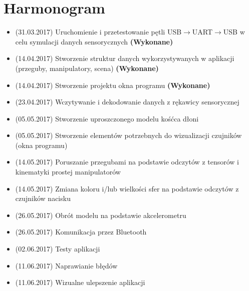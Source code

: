 \documentclass[12pt,a4paper]{article}
\begin{document}
\newpage
\section{Harmonogram}
\begin{itemize}
\item (31.03.2017) Uruchomienie i przetestowanie pętli USB$\rightarrow $UART$\rightarrow $USB w celu symulacji danych sensorycznych \textbf{(Wykonane)}
\item (14.04.2017) Stworzenie struktur danych wykorzystywanych w aplikacji (przeguby, manipulatory, scena) \textbf{(Wykonane)}
\item (14.04.2017) Stworzenie projektu okna programu \textbf{(Wykonane)}
\item (23.04.2017) Wczytywanie i dekodowanie danych z rękawicy sensorycznej
\item (05.05.2017) Stworzenie uproszczonego modelu kośćca dłoni
\item (05.05.2017) Stworzenie elementów potrzebnych do wizualizacji czujników (okna programu)
\item (14.05.2017) Poruszanie przegubami na podstawie odczytów z tensorów i kinematyki prostej manipulatorów
\item (14.05.2017) Zmiana koloru i/lub wielkości sfer na podstawie odczytów z czujników nacisku
\item (26.05.2017) Obrót modelu na podstawie akcelerometru
\item (26.05.2017) Komunikacja przez Bluetooth
\item (02.06.2017) Testy aplikacji
\item (11.06.2017) Naprawianie błędów
\item (11.06.2017) Wizualne ulepszenie aplikacji
\end{itemize}


\end{document}
